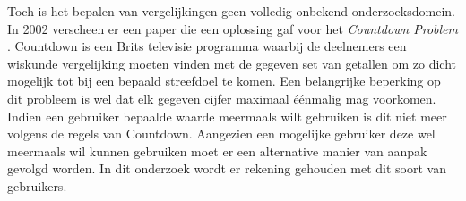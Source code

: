 \documentclass[Main.tex]{subfiles}
\begin{document}
Toch is het bepalen van vergelijkingen geen volledig onbekend onderzoeksdomein. In 2002 verscheen er een paper die een oplossing gaf voor het \textit{Countdown Problem} \cite{countdown}. Countdown is een Brits televisie programma waarbij de deelnemers een wiskunde vergelijking moeten vinden met de gegeven set van getallen om zo dicht mogelijk tot bij een bepaald streefdoel te komen. Een belangrijke beperking op dit probleem is wel dat elk gegeven cijfer maximaal \'e\'enmalig mag voorkomen. Indien een gebruiker bepaalde waarde meermaals wilt gebruiken is dit niet meer volgens de regels van Countdown. Aangezien een mogelijke gebruiker deze wel meermaals wil kunnen gebruiken moet er een alternative manier van aanpak gevolgd worden. In dit onderzoek wordt er rekening gehouden met dit soort van gebruikers.
\end{document}
